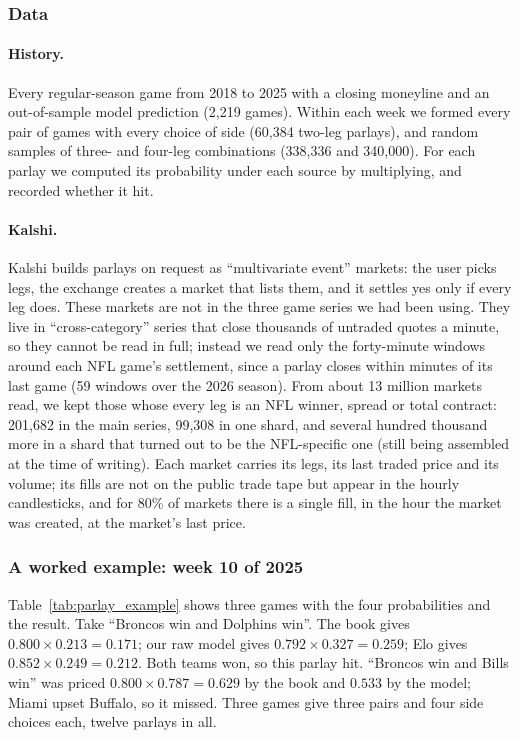 \subsubsection{Data}

\paragraph{History.} Every regular-season game from 2018 to 2025 with a closing moneyline and an out-of-sample model prediction (2,219 games). Within each week we formed every pair of games with every choice of side (60,384 two-leg parlays), and random samples of three- and four-leg combinations (338,336 and 340,000). For each parlay we computed its probability under each source by multiplying, and recorded whether it hit.

\paragraph{Kalshi.} Kalshi builds parlays on request as ``multivariate event'' markets: the user picks legs, the exchange creates a market that lists them, and it settles yes only if every leg does. These markets are not in the three game series we had been using. They live in ``cross-category'' series that close thousands of untraded quotes a minute, so they cannot be read in full; instead we read only the forty-minute windows around each NFL game's settlement, since a parlay closes within minutes of its last game (59 windows over the 2026 season). From about 13 million markets read, we kept those whose every leg is an NFL winner, spread or total contract: 201,682 in the main series, 99,308 in one shard, and several hundred thousand more in a shard that turned out to be the NFL-specific one (still being assembled at the time of writing). Each market carries its legs, its last traded price and its volume; its fills are not on the public trade tape but appear in the hourly candlesticks, and for 80\% of markets there is a single fill, in the hour the market was created, at the market's last price.

\subsubsection{A worked example: week 10 of 2025}

Table~\ref{tab:parlay_example} shows three games with the four probabilities and the result. Take ``Broncos win and Dolphins win''. The book gives $0.800\times0.213 = 0.171$; our raw model gives $0.792\times0.327 = 0.259$; Elo gives $0.852\times0.249 = 0.212$. Both teams won, so this parlay hit. ``Broncos win and Bills win'' was priced $0.800\times0.787 = 0.629$ by the book and $0.533$ by the model; Miami upset Buffalo, so it missed. Three games give three pairs and four side choices each, twelve parlays in all.

